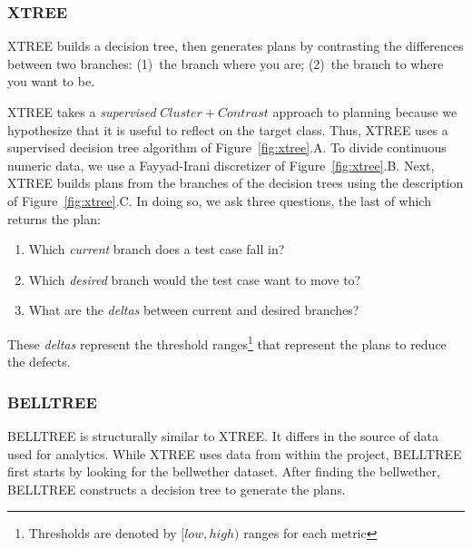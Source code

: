 \documentclass[10pt,journal,compsoc]{IEEEtran}
\newcommand{\be}{\begin{enumerate}}
\newcommand{\ee}{\end{enumerate}}
\newcommand{\fig}[1]{Figure~\ref{fig:#1}}
\begin{document}
\subsubsection{XTREE}
\label{sect:XTREE}


XTREE builds a decision tree,  then generates
plans by contrasting the differences between two branches:
(1)~the branch where you are; (2)~the branch to where you want to be.

XTREE takes a {\em supervised} $Cluster+Contrast$ approach to planning because we hypothesize that it is useful to reflect on the target class. Thus, XTREE uses a supervised decision tree algorithm of \fig{xtree}.A. To divide continuous numeric data, we use a Fayyad-Irani discretizer of \fig{xtree}.B.
Next, XTREE builds plans from the branches of the decision trees using the description of \fig{xtree}.C.
In doing so, we ask three questions, the last of which returns the plan:
\be
\item
Which {\em current} branch does a test case fall in?
\item Which {\em desired} branch would the test case want to move to?
\item What are the {\em deltas} between current and desired branches? 
\ee
These \textit{deltas} represent the threshold ranges\footnote{Thresholds are denoted by $[low,high)$ ranges for each metric} that represent the plans to reduce the defects. 


\subsubsection{BELLTREE}
BELLTREE is structurally similar to XTREE. It differs in the source of data used for analytics. While XTREE uses data from within the project, BELLTREE first starts by looking for the bellwether dataset. After finding the bellwether, BELLTREE constructs a decision tree to generate the plans.
\end{document}
